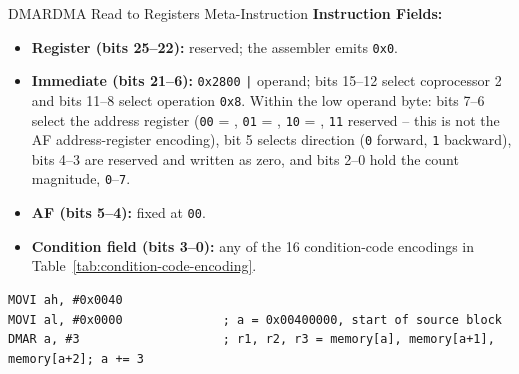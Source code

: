 \begin{instructionbox}{DMAR}{DMA Read to Registers Meta-Instruction}
	\textbf{Instruction Fields:}
	\begin{itemize}
		\item \textbf{Register (bits 25--22):} reserved; the assembler emits \texttt{0x0}.
		\item \textbf{Immediate (bits 21--6):} \texttt{0x2800} \texttt{|} operand; bits 15--12 select coprocessor 2 and
		      bits 11--8 select operation \texttt{0x8}. Within the low operand byte: bits 7--6 select the address
		      register (\texttt{00} = , \texttt{01} = , \texttt{10} = , \texttt{11} reserved --
		      this is not the AF address-register encoding), bit 5 selects direction (\texttt{0} forward, \texttt{1}
		      backward), bits 4--3 are reserved and written as zero, and bits 2--0 hold the count magnitude,
		      \texttt{0}--\texttt{7}.
		\item \textbf{AF (bits 5--4):} fixed at \texttt{00}.
		\item \textbf{Condition field (bits 3--0):} any of the 16 condition-code encodings in
		      Table~\ref{tab:condition-code-encoding}.
	\end{itemize}

	\begin{example}
		\begin{lstlisting}
MOVI ah, #0x0040
MOVI al, #0x0000              ; a = 0x00400000, start of source block
DMAR a, #3                    ; r1, r2, r3 = memory[a], memory[a+1], memory[a+2]; a += 3
		\end{lstlisting}
		\caption{Reading a Memory Block into Registers}
	\end{example}
\end{instructionbox}


